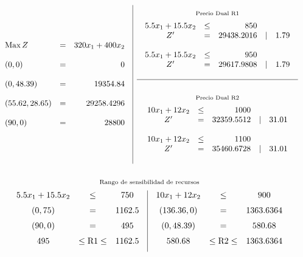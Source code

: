 \documentclass[12pt]{article}
\begin{document}
\[
\begin{array}{c|c}
  \begin{array}{l c r}
    \text{Max} \, Z & = & 320x_1 + 400x_2 \\\\
    (0,0) & = & 0 \\\\
    (0,48.39) & = & 19354.84 \\\\
    (55.62,28.65) & = & 29258.4296 \\\\
    (90,0) & = & 28800
  \end{array}
  &
  \begin{array}{c}
    \overset{\text{Precio Dual R1}\vphantom{\Big|}}{
    \begin{array}{c c r c r}
      5.5x_1 + 15.5x_2 & \leq & 850 &&\\
      Z' & = & 29438.2016 & \mid & 1.79  \\\\
      5.5x_1 + 15.5x_2 & \leq & 950 &&\\
      Z' & = & 29617.9808 & \mid & 1.79  \\\\
    \end{array}} \\
    \hline \\
    \overset{\text{Precio Dual R2}\vphantom{\Big|}}{
    \begin{array}{c c r c r}
      10x_1 + 12x_2 & \leq & 1000 &&\\
      Z' & = & 32359.5512 & \mid & 31.01  \\\\
      10x_1 + 12x_2 & \leq & 1100 &&\\
      Z' & = & 35460.6728 & \mid & 31.01  \\\\
    \end{array}}
  \end{array}
\end{array}
\]

\[\overset{\text{Rango de sensibilidad de recursos}\vphantom{\Big|}}{
  \begin{array}{c|c}
    \begin{array}{c c c}
      5.5x_1 + 15.5x_2 & \leq & 750 \\[6pt]
      (0,75) & = & 1162.5 \\[6pt]
      (90,0) & = & 495 \\[6pt]
      495 & \leq \text{R1} \leq & 1162.5 \\[6pt]
    \end{array}
    &
    \begin{array}{c c c}
      10x_1 + 12x_2 & \leq & 900 \\[6pt]
      (136.36,0) & = & 1363.6364 \\[6pt]
      (0,48.39) & = & 580.68 \\[6pt]
      580.68 & \leq \text{R2} \leq & 1363.6364 \\[6pt]
    \end{array}
  \end{array}
}\]
\end{document}
